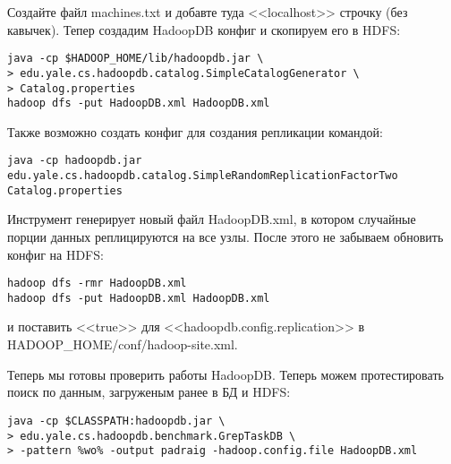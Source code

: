 Создайте файл machines.txt и добавте туда <<localhost>> строчку (без кавычек). Тепер создадим HadoopDB конфиг и скопируем его в HDFS:
\begin{lstlisting}[label=lst:haddop23,caption=Тестирование]
java -cp $HADOOP_HOME/lib/hadoopdb.jar \
> edu.yale.cs.hadoopdb.catalog.SimpleCatalogGenerator \
> Catalog.properties
hadoop dfs -put HadoopDB.xml HadoopDB.xml
\end{lstlisting}

Также возможно создать конфиг для создания репликации командой:
\begin{lstlisting}[label=lst:haddop23:1,caption=Репликация]
java -cp hadoopdb.jar edu.yale.cs.hadoopdb.catalog.SimpleRandomReplicationFactorTwo Catalog.properties
\end{lstlisting}

Инструмент генерирует новый файл HadoopDB.xml, в котором случайные порции данных реплицируются на все узлы.
После этого не забываем обновить конфиг на HDFS:
\begin{lstlisting}[label=lst:haddop23:2,caption=Обновляем конфиг]
hadoop dfs -rmr HadoopDB.xml
hadoop dfs -put HadoopDB.xml HadoopDB.xml
\end{lstlisting}
и поставить <<true>> для <<hadoopdb.config.replication>> в HADOOP\_HOME/conf/hadoop-site.xml.

Теперь мы готовы проверить работы HadoopDB. Теперь можем протестировать поиск по данным, загруженым ранее в БД и HDFS:
\begin{lstlisting}[label=lst:haddop24,caption=Тестирование]
java -cp $CLASSPATH:hadoopdb.jar \
> edu.yale.cs.hadoopdb.benchmark.GrepTaskDB \
> -pattern %wo% -output padraig -hadoop.config.file HadoopDB.xml
\end{lstlisting}

